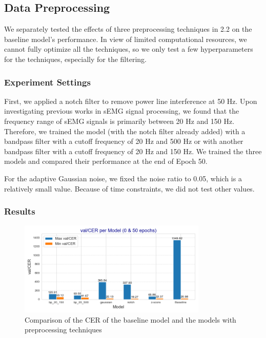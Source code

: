 \subsection{Data Preprocessing}

We separately tested the effects of three preprocessing techniques in 2.2 on the baseline model's performance.
In view of limited computational resources, we cannot fully optimize all the techniques,
so we only test a few hyperparameters for the techniques, especially for the filtering.

\subsubsection{Experiment Settings}
First, we applied a notch filter to remove power line interference at 50 Hz.
Upon investigating previous works in sEMG signal processing, we found that the frequency range of sEMG signals is primarily between 20 Hz and 150 Hz.
Therefore, we trained the model (with the notch filter already added) with a bandpass filter with a cutoff frequency of 20 Hz and 500 Hz or with another bandpass filter with a cutoff frequency of 20 Hz and 150 Hz.
We trained the three models and compared their performance at the end of Epoch 50.

For the adaptive Gaussian noise, we fixed the noise ratio  to 0.05, which is a relatively small value.
Because of time constraints, we did not test other values.

\subsubsection{Results}

\begin{figure}
    \centering
    \includegraphics[width=0.8\textwidth]{figures/data_train.png}
    \caption{Comparison of the CER of the baseline model and the models with preprocessing techniques}
    \label{fig:data_train}
\end{figure}
  

